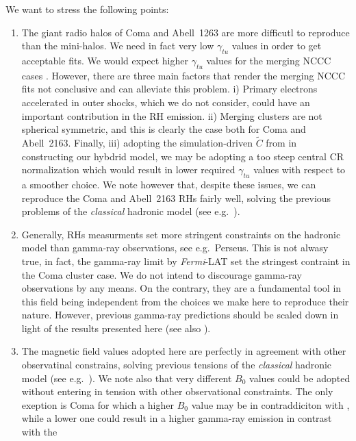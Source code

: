 \documentclass[traditabstract]{aa}
\begin{document}
We want to stress the following points:
\begin{enumerate} 
 \item The giant radio halos of Coma and Abell~1263 are more difficutl to reproduce than the mini-halos. 
       We need in fact very low $\gamma_{tu}$ values in order to get acceptable fits.
       We would expect higher $\gamma_{tu}$ values for the merging NCCC cases \citep{2011A&A...527A..99E}.
       However, there are three main factors that render the merging NCCC fits not conclusive and can alleviate this problem. 
       i) Primary electrons accelerated in outer shocks, which we do not consider, could have an important contribution in the RH emission.
       ii) Merging clusters are not spherical symmetric, and this is clearly the case both for Coma and Abell~2163.
       Finally, iii) adopting the simulation-driven $\tilde{C}$ from \cite{2010MNRAS.409..449P} in constructing our hybdrid model, 
       we may be adopting a too steep central CR normalization which would result in lower required $\gamma_{tu}$ values with respect to a smoother choice.
       We note however that, despite these issues, we can reproduce the Coma and Abell~2163 RHs fairly well, solving the previous problems of the \emph{classical}
       hadronic model (see e.g.~\citealp{2010MNRAS.401...47D}). 
 \item Generally, RHs measurments set more stringent constraints on the hadronic model than gamma-ray observations, see e.g.~Perseus. 
       This is not alwasy true, in fact, the gamma-ray limit by \emph{Fermi}-LAT set the stringest contraint in the Coma cluster case.
       We do not intend to discourage gamma-ray observations by any means. On the contrary, they are a fundamental tool in this field being 
       independent from the choices we make here to reproduce their nature. However, previous gamma-ray predictions should be scaled down
       in light of the results presented here (see also \citealp{2011A&A...527A..99E}).
 \item The magnetic field values adopted here are perfectly in agreement with other observatinal constrains, solving previous tensions of the \emph{classical}
       hadronic model (see e.g.~\citealp{2011ApJ...728...53J}). We note also that very different $B_{0}$ values could be adopted without entering 
       in tension with other observational constraints. The only exeption is Coma for which a higher $B_{0}$ value may be in contraddiciton 
       with \cite{2010A&A...513A..30B}, while a lower one could result in a higher gamma-ray emission in contrast with the \cite{2012AAS...21920701Z}

\end{enumerate}
\end{document}
